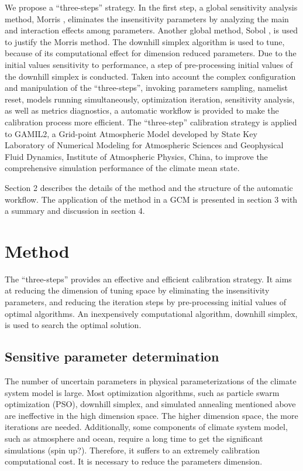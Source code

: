 \documentclass[gmd, manuscript]{copernicus}
\begin{document}
We propose a ``three-steps'' strategy. In the first step, a global sensitivity analysis method, Morris \citep{morris1991factorial,campolongo2007effective}, eliminates the insensitivity parameters by analyzing  the main and interaction effects among parameters. Another global method, Sobol \citep{sobol2001global}, is used to justify the Morris method. The downhill simplex algorithm is used to tune, because of its computational effect for dimension reduced parameters. Due to the initial values sensitivity to performance, a step of pre-processing initial values of the downhill simplex is conducted. Taken into account the complex configuration and manipulation of the ``three-steps'', invoking parameters sampling, namelist reset, models running simultaneously, optimization iteration, sensitivity analysis, as well as metrics diagnostics, a automatic workflow is provided to make the calibration process more efficient. The ``three-step'' calibration strategy is applied to GAMIL2, a Grid-point Atmospheric Model developed by State Key Laboratory of Numerical Modeling for Atmospheric Sciences and Geophysical Fluid Dynamics, Institute of Atmospheric Physics, China, to improve the comprehensive simulation performance of the climate mean state.

Section 2 describes the details of the method and the structure of the automatic workflow. The application of the method in a GCM is presented in section 3 with a summary and discussion in section 4.

\section{Method}
The ``three-steps'' provides an effective and efficient calibration strategy. It aims at reducing the dimension of tuning space by eliminating the insensitivity parameters, and reducing the iteration steps by pre-processing initial values of optimal algorithms. An inexpensively computational algorithm, downhill simplex, is used to search the optimal solution.

\subsection{Sensitive parameter determination}
The number of uncertain parameters in physical parameterizations of the climate system model is large. Most optimization algorithms, such as particle swarm optimization (PSO), downhill simplex, and simulated annealing mentioned above are ineffective in the high dimension space. The higher dimension space, the more iterations are needed.  Additionally, some components of climate system model, such as atmosphere and ocean, require a long time to get the significant simulations (spin up?). Therefore, it suffers to an extremely calibration computational cost.  It is necessary to reduce the parameters dimension. 
\end{document}
